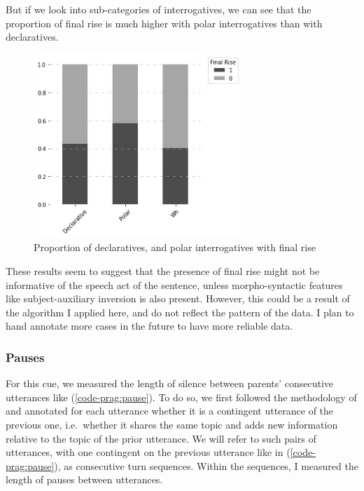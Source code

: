 But if we look into sub-categories of interrogatives, we can see that the proportion of final rise is much higher with polar interrogatives than with declaratives. 
\begin{figure}[H]
    \centering
    \includegraphics[width=0.7\textwidth]{figures/pitch-polardecwh.jpg}
    \caption{Proportion of declaratives, \twh{} and polar interrogatives with final rise}
    \label{fig:rise-int}
\end{figure}

These results seem to suggest that the presence of final rise might not be informative of the speech act of the sentence, unless morpho-syntactic features like subject-auxiliary inversion is also present. However, this could be a result of the algorithm I applied here, and do not reflect the pattern of the data. I plan to hand annotate more cases in the future to have more reliable data.

\subsubsection{Pauses}
\label{sec:engsp:results:pause}

For this cue, we measured the length of silence between parents’ consecutive utterances like (\ref{code-prag:pause}). To do so, we first followed the methodology of \textcite{bloom1976discourse} and annotated for each utterance whether it is a contingent utterance of the previous one, i.e.\ whether it shares the same topic and adds new information relative to the topic of the prior utterance. We will refer to such pairs of utterances, with one contingent on the previous utterance like in (\ref{code-prag:pause}), as consecutive turn sequences. Within the sequences, I measured the length of pauses between utterances. 


